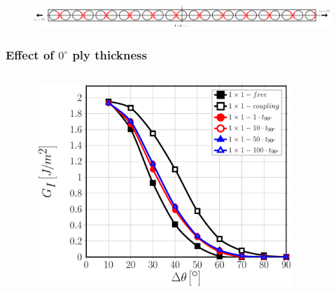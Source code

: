 \documentclass[first,firstsupp,lastsupp,last,hyperref,table]{ETHclass}
\begin{document}
\begin{frame}
\begin{columns}[c]
\begin{column}{0.5\textwidth}
\begin{figure}
\end{figure}
\end{column}
\end{columns}
\begin{figure}
\centering
\includegraphics[width=\textwidth]{onefiber-sameside-crackshielding1.pdf}
\end{figure}
\end{frame}

\addtocounter{framenumber}{-1}

\begin{frame}
\frametitle{\vspace{0.2cm}\small Effect of $0^{\circ}$ ply thickness}
\vspace{-.75cm}
\centering
\begin{columns}[c]
\centering
\begin{column}{0.5\textwidth}
\centering
\begin{figure}
\centering
\includegraphics[width=\columnwidth]{1x1-i-vf60-GI-coupling.pdf}
\end{figure}
\end{column}
\begin{column}{0.5\textwidth}
\centering
\begin{figure}
\centering

\end{figure}
\end{column}
\end{columns}
\end{frame}
\end{document}
